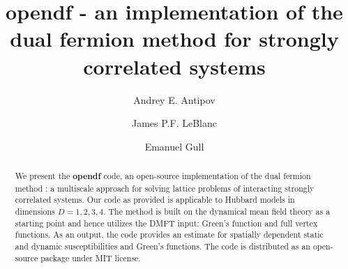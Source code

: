 \documentclass[3p,times,procedia]{elsarticle}
\begin{document}
\begin{frontmatter}




\title{opendf - an implementation of the dual fermion method for strongly correlated systems }




\author[a]{Andrey E. Antipov} 
\author[a]{James P.F. LeBlanc}
\author[a]{Emanuel Gull}

\address[a]{Department of Physics, University of Michigan, Ann Arbor, Michigan 48109, USA}

\begin{abstract}
We present the \textbf{opendf} code, an open-source implementation of the dual fermion method : a multiscale approach for solving lattice problems of interacting strongly correlated systems. Our code as provided is applicable to Hubbard models in dimensions $D=1,2,3,4$. The method is built on the dynamical mean field theory as a starting point and hence utilizes the DMFT input: Green's function and full vertex functions. As an output, the code provides an estimate for spatially dependent static and dynamic susceptibilities and Green's functions. The code is distributed as an open-source package under MIT license. 
\end{abstract}


\end{frontmatter}
\end{document}
